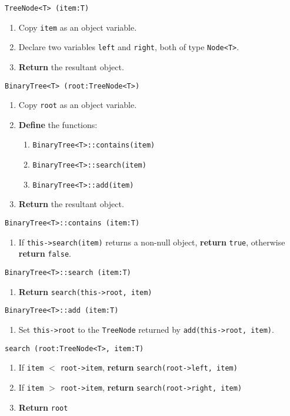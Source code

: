 \algorithm
\texttt{TreeNode<T> (item:T)}
\begin{enumerate}
	\item Copy \texttt{item} as an object variable.
	\item Declare two variables \texttt{left} and \texttt{right}, both of type \texttt{Node<T>}.
	\item \textbf{Return} the resultant object.
\end{enumerate}
\vspace{8mm}
\texttt{BinaryTree<T> (root:TreeNode<T>)}
\begin{enumerate}
	\item Copy \texttt{root} as an object variable.
	\item \textbf{Define} the functions:
	\begin{enumerate}
		\item \texttt{BinaryTree<T>::contains(item)} 
		\item \texttt{BinaryTree<T>::search(item)} 
		\item \texttt{BinaryTree<T>::add(item)} 
	\end{enumerate}
	\item \textbf{Return} the resultant object.
\end{enumerate}
\vspace{5mm}
\texttt{BinaryTree<T>::contains (item:T)}
\begin{enumerate}
	\item If \texttt{this->search(item)} returns a non-null object, \textbf{return} \texttt{true}, otherwise
		\textbf{return} \texttt{false}.
\end{enumerate}
\vspace{5mm}
\texttt{BinaryTree<T>::search (item:T)}
\begin{enumerate}
	\item \textbf{Return} \texttt{search(this->root, item)}
\end{enumerate}
\vspace{5mm}
\texttt{BinaryTree<T>::add (item:T)}
\begin{enumerate}
	\item Set \texttt{this->root} to the \texttt{TreeNode} returned by \texttt{add(this->root, item)}.
\end{enumerate}
\vspace{5mm}
\texttt{search (root:TreeNode<T>, item:T)} 
\begin{enumerate}
	\item If \texttt{item} $<$ \texttt{root->item}, \textbf{return} \texttt{search(root->left, item)}
	\item If \texttt{item} $>$ \texttt{root->item}, \textbf{return} \texttt{search(root->right, item)}
	\item \textbf{Return} \texttt{root}
\end{enumerate}
